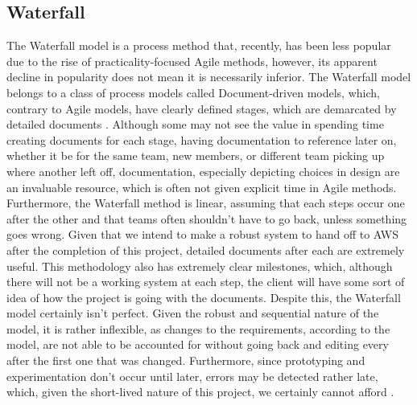 \subsection{Waterfall}
The Waterfall model is a process method that, recently, has been less popular due to the rise of practicality-focused Agile methods, however, its apparent decline in popularity does not mean it is necessarily inferior. The Waterfall model belongs to a class of process models called Document-driven models, which, contrary to Agile models, have clearly defined stages, which are demarcated by detailed documents \cite{spiralmode;}. Although some may not see the value in spending time creating documents for each stage, having documentation to reference later on, whether it be for the same team, new members, or different team picking up where another left off, documentation, especially depicting choices in design are an invaluable resource, which is often not given explicit time in Agile methods. Furthermore, the Waterfall method is linear, assuming that each steps occur one after the other and that teams often shouldn't have to go back, unless something goes wrong. Given that we intend to make a robust system to hand off to AWS after the completion of this project, detailed documents after each are extremely useful. This methodology also has extremely clear milestones, which, although there will not be a working system at each step, the client will have some sort of idea of how the project is going with the documents. Despite this, the Waterfall model certainly isn't perfect. Given the robust and sequential nature of the model, it is rather inflexible, as changes to the requirements, according to the model, are not able to be accounted for without going back and editing every after the first one that was changed. Furthermore, since prototyping and experimentation don't occur until later, errors may be detected rather late, which, given the short-lived nature of this project, we certainly cannot afford \cite{comparitvestudy}.

